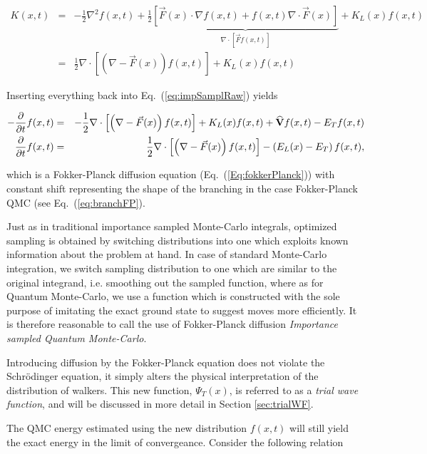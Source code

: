 \begin{eqnarray*}
 K(x, t) &=& - \frac{1}{2}\nabla^2 f(x, t) + \frac{1}{2}\underbrace{\left[\vec F(x)\cdot \nabla f(x, t) + f(x, t)\nabla\cdot \vec F(x)\right]}_{\nabla\cdot\left[\vec F f(x, t)\right]} + K_L(x)f(x, t)\\
         &=& \frac{1}{2}\nabla\cdot \left[\left(\nabla - \vec F(x)\right)f(x, t)\right] + K_L(x)f(x, t)
\end{eqnarray*}

Inserting everything back into Eq.~(\ref{eq:impSamplRaw}) yields

\begin{eqnarray}
 -\frac{\partial}{\partial t}f(x, t) &=& -\frac{1}{2}\nabla\cdot \left[\left(\nabla - \vec F(x)\right)f(x, t)\right] + K_L(x)f(x, t) + {\bf\widehat{V}}f(x, t) - E_Tf(x,t) \nonumber\\
  \frac{\partial}{\partial t}f(x, t)  &=& \frac{1}{2}\nabla\cdot \left[\left(\nabla - \vec F(x)\right)f(x, t)\right] - \left(E_L(x) - E_T\right)f(x, t), 
\end{eqnarray}

which is a Fokker-Planck diffusion equation (Eq.~(\ref{Eq:fokkerPlanck})) with constant shift representing the shape of the branching in the case Fokker-Planck QMC (see Eq.~(\ref{eq:branchFP}).

Just as in traditional importance sampled Monte-Carlo integrals, optimized sampling is obtained by switching distributions into one which exploits known information about the problem at hand. In case of standard Monte-Carlo integration, we switch sampling distribution to one which are similar to the original integrand, i.e. smoothing out the sampled function, where as for Quantum Monte-Carlo, we use a function which is constructed with the sole purpose of imitating the exact ground state to suggest moves more efficiently. It is therefore reasonable to call the use of Fokker-Planck diffusion \textit{Importance sampled Quantum Monte-Carlo}.

Introducing diffusion by the Fokker-Planck equation does not violate the Schrödinger equation, it simply alters the physical interpretation of the distribution of walkers. This new function, $\Psi_T(x)$, is referred to as a \textit{trial wave function}, and will be discussed in more detail in Section \ref{sec:trialWF}.

The QMC energy estimated using the new distribution $f(x, t)$ will still yield the exact energy in the limit of convergeance. Consider the following relation

